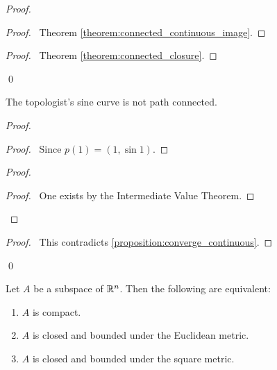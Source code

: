 \begin{proof}
    \pf
    \begin{proof}
        \pf\ Theorem \ref{theorem:connected_continuous_image}.
    \end{proof}
    \begin{proof}
        \pf\ Theorem \ref{theorem:connected_closure}.
    \end{proof}
    \qed
\end{proof}

\begin{proposition}[CC]
    The topologist's sine curve is not path connected.
\end{proposition}

\begin{proof}
    \pf
    \begin{proof}
        \pf\ Since $p(1) = (1, \sin 1)$.
    \end{proof}
    \step{4}{\pick\ a sequence $(t_n)_{n \geq 1}$ in $(b,1]$ such that $t_n \rightarrow b$ and $\pi_2(p(t_n)) = (-1)^n$}
    \begin{proof}
        \begin{proof}
            \pf\ One exists by the Intermediate Value Theorem.
        \end{proof}
    \end{proof}
    \qedstep
    \begin{proof}
        \pf\ This contradicts \ref{proposition:converge_continuous}.
    \end{proof}
    \qed
\end{proof}

\begin{theorem}
    Let $A$ be a subspace of $\mathbb{R}^n$. Then the following are equivalent:
    \begin{enumerate}
        \item $A$ is compact.
        \item $A$ is closed and bounded under the Euclidean metric.
        \item $A$ is closed and bounded under the square metric.
    \end{enumerate}
\end{theorem}

